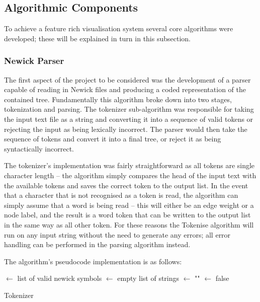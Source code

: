 \documentclass[10pt,letterpaper]{article}
\begin{document}
\subsection * {Algorithmic Components}
To achieve a feature rich visualisation system several core algorithms were developed; these will be explained in turn in this subsection.

\subsubsection * {Newick Parser} 
The first aspect of the project to be considered was the development of a parser capable of reading in Newick files and producing a coded representation of the contained tree. Fundamentally this algorithm broke down into two stages, tokenization and parsing. The tokenizer sub-algorithm was responsible for taking the input text file as a string and converting it into a sequence of valid tokens or rejecting the input as being lexically incorrect. The parser would then take the sequence of tokens and convert it into a final tree, or reject it as being syntactically incorrect. 

The tokenizer’s implementation was fairly straightforward as all tokens are single character length – the algorithm simply compares the head of the input text with the available tokens and saves the correct token to the output list. In the event that a character that is not recognised as a token is read, the algorithm can simply assume that a word is being read – this will either be an edge weight or a node label, and the result is a word token that can be written to the output list in the same way as all other token. For these reasons the Tokenise algorithm will run on any input string without the need to generate any errors; all error handling can be performed in the parsing algorithm instead.

The algorithm’s pseudocode implementation is as follows: 

\begin{algorithm}[H]
\SetAlgoLined
{}
 


\BlankLine

\ValidTokens$\leftarrow$ list of valid newick symbols\;
\Tokens$\leftarrow$ empty list of strings\;
\Word$\leftarrow$ ""\;
\ReadingWordFlag$\leftarrow$ false\;
\caption{Tokenizer}
\end{algorithm}
\end{document}
